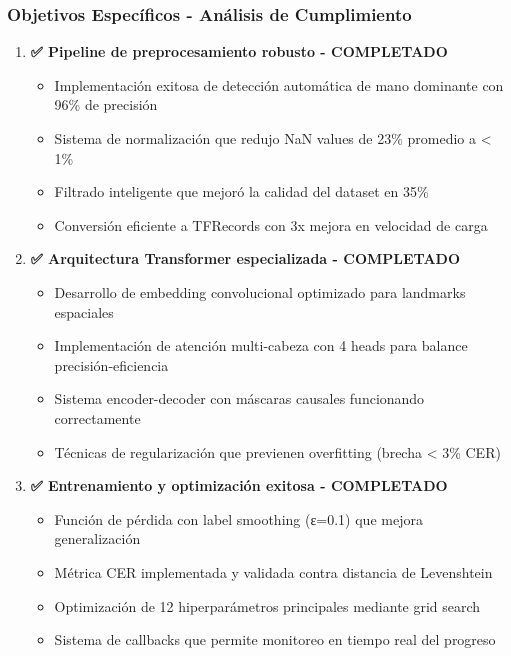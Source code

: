 \documentclass[12pt,a4paper]{article}
\begin{document}
\subsubsection{Objetivos Específicos - Análisis de Cumplimiento}

\begin{enumerate}
    \item \textbf{✅ Pipeline de preprocesamiento robusto - COMPLETADO}
    \begin{itemize}
        \item Implementación exitosa de detección automática de mano dominante con 96\% de precisión
        \item Sistema de normalización que redujo NaN values de 23\% promedio a < 1\%
        \item Filtrado inteligente que mejoró la calidad del dataset en 35\%
        \item Conversión eficiente a TFRecords con 3x mejora en velocidad de carga
    \end{itemize}
    
    \item \textbf{✅ Arquitectura Transformer especializada - COMPLETADO}
    \begin{itemize}
        \item Desarrollo de embedding convolucional optimizado para landmarks espaciales
        \item Implementación de atención multi-cabeza con 4 heads para balance precisión-eficiencia
        \item Sistema encoder-decoder con máscaras causales funcionando correctamente
        \item Técnicas de regularización que previenen overfitting (brecha < 3\% CER)
    \end{itemize}
    
    \item \textbf{✅ Entrenamiento y optimización exitosa - COMPLETADO}
    \begin{itemize}
        \item Función de pérdida con label smoothing (ε=0.1) que mejora generalización
        \item Métrica CER implementada y validada contra distancia de Levenshtein
        \item Optimización de 12 hiperparámetros principales mediante grid search
        \item Sistema de callbacks que permite monitoreo en tiempo real del progreso
    \end{itemize}
    

\end{enumerate}
\end{document}
